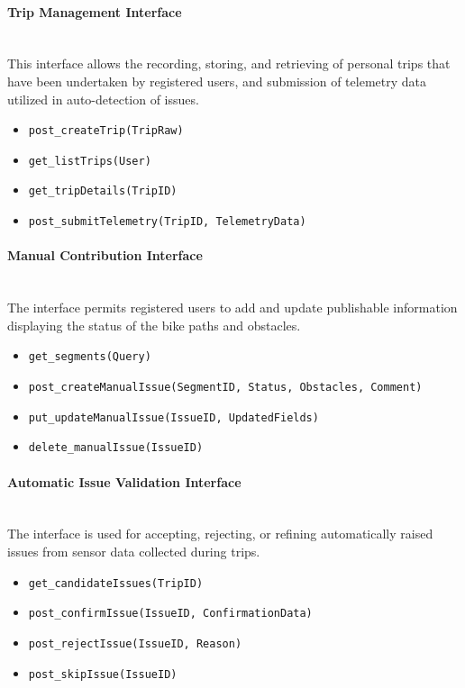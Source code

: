 \paragraph{Trip Management Interface} \mbox{}\\
This interface allows the recording, storing, and retrieving of personal trips that have been
undertaken by registered users, and submission of telemetry data utilized in auto-detection of issues.
\begin{itemize}
    \item \texttt{post\_createTrip(TripRaw)}
    \item \texttt{get\_listTrips(User)}
    \item \texttt{get\_tripDetails(TripID)}
    \item \texttt{post\_submitTelemetry(TripID, TelemetryData)}
\end{itemize}

\paragraph{Manual Contribution Interface} \mbox{}\\
The interface permits registered users to add and update publishable information displaying
the status of the bike paths and obstacles.
\begin{itemize}
    \item \texttt{get\_segments(Query)}
    \item \texttt{post\_createManualIssue(SegmentID, Status, Obstacles, Comment)}
    \item \texttt{put\_updateManualIssue(IssueID, UpdatedFields)}
    \item \texttt{delete\_manualIssue(IssueID)}
\end{itemize}

\paragraph{Automatic Issue Validation Interface} \mbox{}\\
The interface is used for accepting, rejecting, or refining automatically raised issues from
sensor data collected during trips.
\begin{itemize}
    \item \texttt{get\_candidateIssues(TripID)}
    \item \texttt{post\_confirmIssue(IssueID, ConfirmationData)}
    \item \texttt{post\_rejectIssue(IssueID, Reason)}
    \item \texttt{post\_skipIssue(IssueID)}
\end{itemize}

